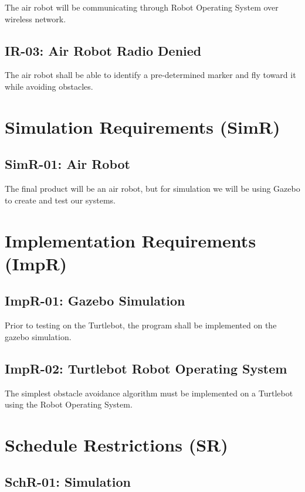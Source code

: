 \documentclass[]{report}
\begin{document}
The air robot will be communicating through Robot Operating System over wireless network.

\subsection{IR-03: Air Robot Radio Denied}

The air robot shall be able to identify a pre-determined marker and fly toward it while avoiding obstacles.


\section{Simulation Requirements (SimR)}

\subsection{SimR-01: Air Robot}
The final product will be an air robot, but for simulation we will be using Gazebo to create and test our systems. 


\section{Implementation Requirements (ImpR)}

\subsection{ImpR-01: Gazebo Simulation}

Prior to testing on the Turtlebot, the program shall be implemented on the gazebo simulation.

\subsection{ImpR-02: Turtlebot Robot Operating System}

The simplest obstacle avoidance algorithm must be implemented on a Turtlebot using the Robot Operating System.


\section{Schedule Restrictions (SR)}

\subsection{SchR-01: Simulation}
\end{document}
